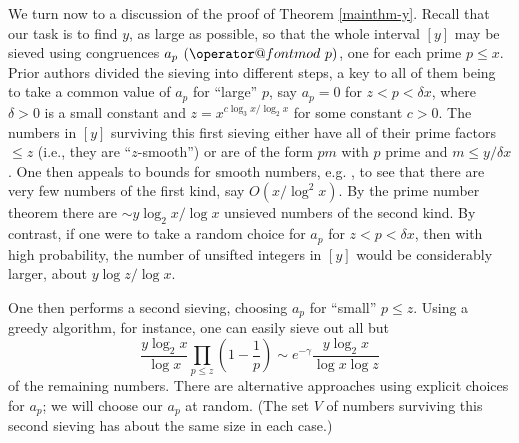 \documentclass[11pt]{amsart}
\makeatletter
\numberwithin{equation}{section}  %
\theoremstyle{remark}
\theoremstyle{plain}
\newtheorem{thm}{Theorem}
\numberwithin{equation}{section}
\renewcommand{\pmod}[1]{\allowbreak\mkern7mu({\operator@font mod}\,\,#1)}
\newcommand{\del}{\ensuremath{\delta}}
\renewcommand{\le}{\leqslant}
\renewcommand{\leq}{\leqslant}
\renewcommand{\ge}{\geqslant}
\renewcommand{\(}{\left(}
\renewcommand{\)}{\right)}
\newcommand{\asym}{\sim}   %
\makeatother
\begin{document}
\begin{comment} %
Theorem~\ref{mainthm} immediately follows from the following lemma about
Jacobsthal's function.

\begin{thm}\label{mainlem}
 For any $R>0$ and for sufficiently large $x$
there are
$$\ge R\frac{x \log x \log_3 x}{(\log_2 x)^2}$$
consecutive integers, each having a prime divisor not exceeding $x$.
Consequently, by taking $n=n_x$ to be the product of primes $\le x$,
\[
J(x) \ge f(x) \frac{\log x \log_2 x \log_4 x}{(\log_3 x)^2},
\]
where $f(x)\to \infty$ as $x\to \infty$.
\end{thm}

Proving Theorem \ref{mainlem} is accomplished by selecting a residue class
$a_p\pmod{p}$ for each prime $p\le x$, which together ``sieve out'' 
all of the numbers $[y]$ (that is, every positive integer 
$\le y$ lies in one of the residue classes), where
$$y> R\frac{x \log x \log_3 x}{(\log_2 x)^2}.$$
Taking $m$ to be a positive integer such that
 $m\equiv -a_p\pmod{p}$ for all $p$, we see that the numbers
 $m+1,\ldots,m+y$ are each divisible by a prime $\le x$.
 \end{comment} %

We turn now to a discussion of the proof of Theorem \ref{mainthm-y}. Recall that our task is to find $y$, as large as possible, so that the whole interval $[y]$ may be sieved using congruences $a_p \pmod{p}$, one for each prime $p \leq x$. Prior authors divided the sieving into different steps, a key to all of
them being to take a common value of $a_p$ for ``large'' $p$,
say $a_p=0$ for $z<p<\del x$, where $\delta>0$ is a small constant and $z=x^{c\log_3 x/\log_2 x}$ for
some constant $c>0$.
The numbers
in $[y]$ surviving this first sieving either have all of their prime factors 
$\le z$ (i.e., they are ``$z$-smooth'') or are of the form $pm$ with $p$ prime
and $m\le y/\del x$.  One then appeals
to bounds for smooth numbers, e.g. \cite{deB},
to see that there are very few numbers of the first kind, say $O(x/\log^2 x)$.
By the prime number theorem there are
 $\asym y\log_2 x/\log x$ unsieved numbers of the second kind.
By contrast, if one were to take a random choice for $a_p$ for 
$z<p<\del x$, then with high probability, the number of unsifted integers
in $[y]$ would be considerably larger, about
$y\log z/\log x$.

One then performs a second sieving, choosing $a_p$ for ``small'' $p\le z$. 
Using a greedy algorithm, for instance, one can easily sieve out all but
\[
\frac{y\log_2 x}{\log x} \prod_{p\le z} \(1-\frac{1}{p}\) \asym
e^{-\gamma} \frac{y\log_2 x}{\log x \log z}
\]
of the remaining numbers.  There are alternative approaches using explicit
choices for $a_p$; we will choose our $a_p$ at random.  (The set $V$ of numbers surviving this second sieving has about the same size in each case.)
\end{document}
